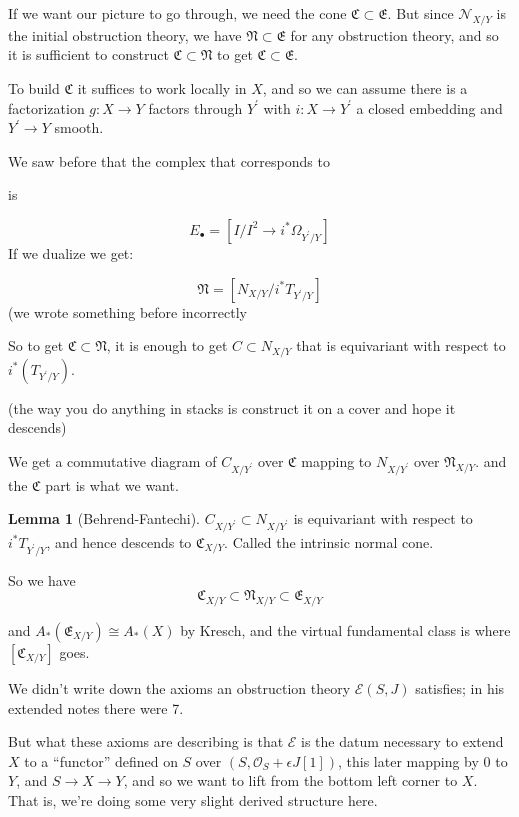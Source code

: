 \documentclass{amsart}
\theoremstyle{definition}
\newtheorem{lemma}[dummy]{Lemma}
\newcommand{\OO}{\mathcal{O}}
\begin{document}
If we want our picture to go through, we need the cone $\mathfrak{C}\subset\mathfrak{E}$.  But since $\mathcal{N}_{X/Y}$ is the initial obstruction theory, we have $\mathfrak{N}\subset \mathfrak{E}$ for any obstruction theory, and so it is sufficient to construct $\mathfrak{C}\subset\mathfrak{N}$ to get $\mathfrak{C}\subset\mathfrak{E}$.


To build $\mathfrak{C}$ it suffices to work locally in $X$, and so we can assume there is a factorization $g:X\to Y$ factors through $Y^\prime$ with $i:X\to Y^\prime$ a closed embedding and $Y^\prime\to Y$ smooth.


We saw before that the complex that corresponds to 

is

$$E_\bullet=[I/I^2\to i^*\Omega_{Y^\prime/Y}]$$
If we dualize we get:

$$\mathfrak{N}=[N_{X/Y}/i^*T_{Y^\prime/Y}]$$
(we wrote something before incorrectly

So to get $\mathfrak{C}\subset\mathfrak{N}$, it is enough to get $C\subset N_{X/Y}$ that is equivariant with respect to $i^*(T_{Y^\prime/Y})$.

(the way you do anything in stacks is construct it on a cover and hope it descends)


We get a commutative diagram of $C_{X/Y^\prime}$ over $\mathfrak{C}$ mapping to $N_{X/Y^\prime}$ over $\mathfrak{N}_{X/Y}$.  and the $\mathfrak{C}$ part is what we want.


\begin{lemma}[Behrend-Fantechi]
$C_{X/Y^\prime}\subset N_{X/Y^\prime}$ is equivariant with respect to $i^*T_{Y^\prime/Y}$, and hence descends to $\mathfrak{C}_{X/Y}$. Called the intrinsic normal cone.
\end{lemma}



So we have
$$\mathfrak{C}_{X/Y}\subset\mathfrak{N}_{X/Y}\subset\mathfrak{E}_{X/Y}$$

and $A_*(\mathfrak{E}_{X/Y})\cong A_*(X)$ by Kresch, and the virtual fundamental class is where $[\mathfrak{C}_{X/Y}]$ goes.

We didn't write down the axioms an obstruction theory $\mathcal{E}(S, J)$ satisfies; in his extended notes there were 7.

But what these axioms are describing is that $\mathcal{E}$ is the datum necessary to extend $X$ to a ``functor'' defined on $S$ over $(S,\OO_S+\epsilon J[1])$, this later mapping by $0$ to $Y$, and $S\to X\to Y$, and so we want to lift from the bottom left corner to $X$.  That is, we're doing some very slight derived structure here.
\end{document}

